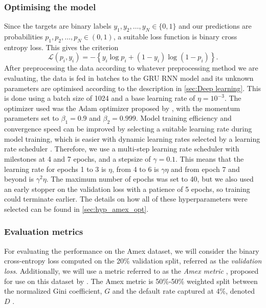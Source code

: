 \documentclass{statsmsc}
\begin{document}
{\subsubsection{Optimising the model}%
\label{ssub:Optimising the model}

Since the targets are binary labels $y_1,y_2,\dots,y_N \in \{0,1\}$ and our predictions are
probabilities $p_1,p_2,\dots,p_N \in (0,1)$, a suitable loss function is binary cross entropy loss.
This gives the criterion
\begin{equation}
    \mathcal{L}(p_i,y_i)=- \left\{y_i \log p_i + (1-y_i) \log\left( 1- p_i \right)\right\}.
\end{equation}
After preprocessing the data according to whatever preprocessing method we are evaluating,
the data is fed
in batches to the \ac{GRU} \ac{RNN} model and its unknown parameters are optimised according
to the description in \cref{sec:Deep learning}. This is done using a batch size of 1024 and
a base learning rate of $\eta=10^{-3}$. The optimizer used was the Adam optimizer proposed by
\cite{adam}, with the momentum parameters set to $\beta_1=0.9$ and $\beta_2=0.999$.
Model training efficiency and convergence speed can be improved by selecting a suitable learning
rate during model training, which is easier with dynamic learning rates selected by a learning
rate scheduler \citep{lr_demyst}. Therefore, we use a multi-step learning rate scheduler with milestones
at 4 and 7 epochs, and a stepsize of $\gamma=0.1$. This means that the learning rate for epochs
1 to 3 is $\eta$, from 4 to 6 is $\gamma\eta$ and from epoch 7 and beyond is $\gamma^2\eta$.
The maximum number of epochs was set to 40, but we also used an early stopper on the validation loss
with a patience of 5 epochs, so training could terminate earlier.
The details on how all of these hyperparameters were selected can be found in \cref{sec:hyp_amex_opt}.

\subsubsection{Evaluation metrics}%
\label{ssub:Evaluation metrics}

For evaluating the performance on the Amex dataset, we will consider the binary cross-entropy loss
computed on the 20\% validation split, referred as the \textit{validation loss}. Additionally,
we will use a metric referred to as the \textit{Amex metric }, proposed for use on this dataset
by \cite{amex-data}. The Amex metric is 50\%-50\% weighted split between the
normalized Gini coefficient, $G$ and the default rate captured at 4\%, denoted $D$
\citep{amex-data}.

}
\end{document}
